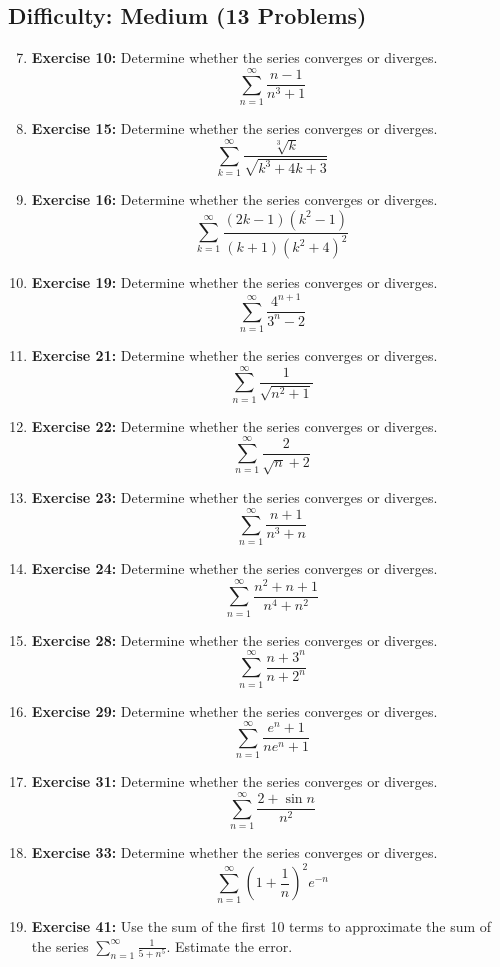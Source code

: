 \documentclass{article}
\begin{document}
\subsection*{Difficulty: Medium (13 Problems)}
\begin{enumerate}
    \setcounter{enumi}{6} %
    \item \textbf{Exercise 10:} Determine whether the series converges or diverges.
    \[ \sum_{n=1}^{\infty} \frac{n-1}{n^3+1} \]
    \item \textbf{Exercise 15:} Determine whether the series converges or diverges.
    \[ \sum_{k=1}^{\infty} \frac{\sqrt[3]{k}}{\sqrt{k^3+4k+3}} \]
    \item \textbf{Exercise 16:} Determine whether the series converges or diverges.
    \[ \sum_{k=1}^{\infty} \frac{(2k-1)(k^2-1)}{(k+1)(k^2+4)^2} \]
    \item \textbf{Exercise 19:} Determine whether the series converges or diverges.
    \[ \sum_{n=1}^{\infty} \frac{4^{n+1}}{3^n-2} \]
    \item \textbf{Exercise 21:} Determine whether the series converges or diverges.
    \[ \sum_{n=1}^{\infty} \frac{1}{\sqrt{n^2+1}} \]
    \item \textbf{Exercise 22:} Determine whether the series converges or diverges.
    \[ \sum_{n=1}^{\infty} \frac{2}{\sqrt{n}+2} \]
    \item \textbf{Exercise 23:} Determine whether the series converges or diverges.
    \[ \sum_{n=1}^{\infty} \frac{n+1}{n^3+n} \]
    \item \textbf{Exercise 24:} Determine whether the series converges or diverges.
    \[ \sum_{n=1}^{\infty} \frac{n^2+n+1}{n^4+n^2} \]
    \item \textbf{Exercise 28:} Determine whether the series converges or diverges.
    \[ \sum_{n=1}^{\infty} \frac{n+3^n}{n+2^n} \]
    \item \textbf{Exercise 29:} Determine whether the series converges or diverges.
    \[ \sum_{n=1}^{\infty} \frac{e^n+1}{ne^n+1} \]
    \item \textbf{Exercise 31:} Determine whether the series converges or diverges.
    \[ \sum_{n=1}^{\infty} \frac{2+\sin n}{n^2} \]
    \item \textbf{Exercise 33:} Determine whether the series converges or diverges.
    \[ \sum_{n=1}^{\infty} (1+\frac{1}{n})^2 e^{-n} \]
    \item \textbf{Exercise 41:} Use the sum of the first 10 terms to approximate the sum of the series $\sum_{n=1}^{\infty} \frac{1}{5+n^5}$. Estimate the error.
\end{enumerate}
\end{document}
